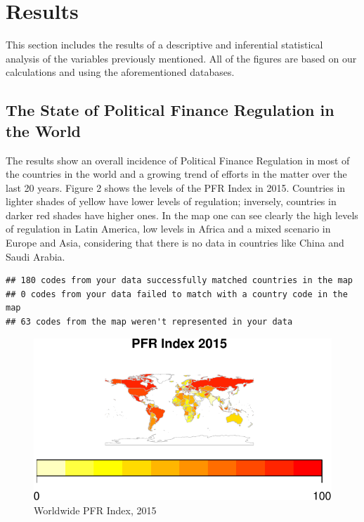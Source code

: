\documentclass[12,twoside]{article}
\begin{document}
\section{Results}\label{results}

This section includes the results of a descriptive and inferential
statistical analysis of the variables previously mentioned. All of the
figures are based on our calculations and using the aforementioned
databases.

\subsection{The State of Political Finance Regulation in the
World}\label{the-state-of-political-finance-regulation-in-the-world}

The results show an overall incidence of Political Finance Regulation in
most of the countries in the world and a growing trend of efforts in the
matter over the last 20 years. Figure 2 shows the levels of the PFR
Index in 2015. Countries in lighter shades of yellow have lower levels
of regulation; inversely, countries in darker red shades have higher
ones. In the map one can see clearly the high levels of regulation in
Latin America, low levels in Africa and a mixed scenario in Europe and
Asia, considering that there is no data in countries like China and
Saudi Arabia. \pagebreak

\begin{verbatim}
## 180 codes from your data successfully matched countries in the map
## 0 codes from your data failed to match with a country code in the map
## 63 codes from the map weren't represented in your data
\end{verbatim}

\begin{figure}[h]

{\centering \includegraphics{thesis_body_files/figure-latex/figure_ii-1} 

}

\caption{Worldwide PFR Index, 2015}\label{fig:figure_ii}
\end{figure}
\end{document}
